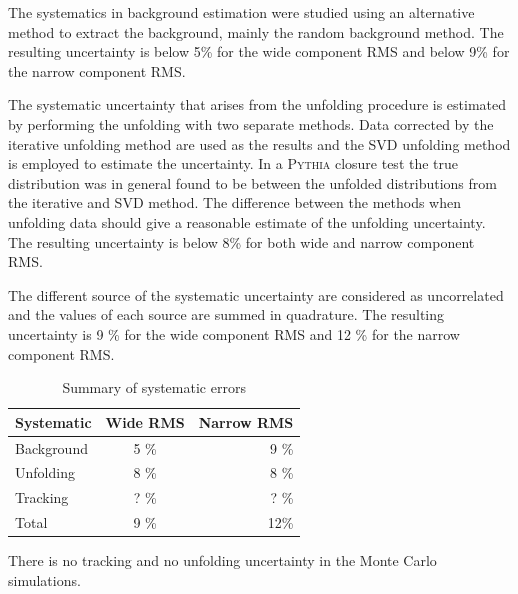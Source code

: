The systematics in background estimation were studied using an alternative method to extract the background, mainly the random background method. The resulting uncertainty is below 5\% for the wide component RMS and below 9\% for the narrow component RMS. 

The systematic uncertainty that arises from the unfolding procedure is estimated by performing the unfolding with two separate methods. Data corrected by the iterative unfolding method are used as the results and the SVD unfolding method is employed to estimate the uncertainty. In a \textsc{Pythia} closure test the true distribution was in general found to be between the unfolded distributions from the iterative and SVD method. The difference between the methods when unfolding data should give a reasonable estimate of the unfolding uncertainty. The resulting uncertainty is below 8\% for both wide and narrow component RMS.

The different source of the systematic uncertainty are considered as uncorrelated and the values of each source are summed in quadrature. The resulting uncertainty is 9 \% for the wide component RMS and 12 \% for the narrow component RMS. 

\begin{table}[htb]
\centering
\caption{Summary of systematic errors}
\label{tab:systematics}
\begin{tabular}{ l | c | r }
  Systematic & Wide RMS & Narrow RMS \\
    \hline			
  Background & 5 \% & 9 \% \\
  Unfolding & 8 \% & 8 \% \\
  Tracking & ? \% & ? \% \\
  Total & 9 \% & 12\% \\
  \hline
  \end{tabular}
  \end{table}

There is no tracking and no unfolding uncertainty in the Monte Carlo simulations. 


%
%


